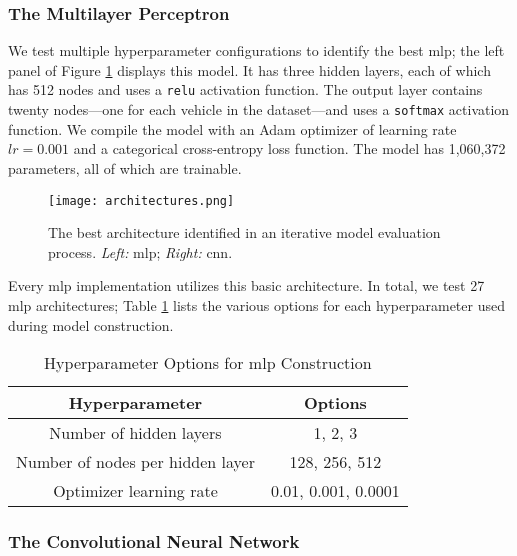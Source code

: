 \documentclass[../main.tex]{subfiles}
\begin{document}
\subsubsection{The Multilayer Perceptron}\label{model:mlp}


We test multiple hyperparameter configurations to identify the best \ac{mlp}; the left panel of Figure \ref{fig:best-archs} displays this model. It has three hidden layers, each of which has 512 nodes and uses a \texttt{relu} activation function. The output layer contains twenty nodes---one for each vehicle in the dataset---and uses a \texttt{softmax} activation function. We compile the model with an Adam optimizer of learning rate $lr = 0.001$ and a categorical cross-entropy loss function. The model has 1,060,372 parameters, all of which are trainable.

\begin{figure}
    \centerline{\texttt{[image: architectures.png]}}
    \caption{The best architecture identified in an iterative model evaluation process. \textit{Left:} \acl{mlp}; \textit{Right:} \acl{cnn}.}
    \label{fig:best-archs}
\end{figure}

Every \ac{mlp} implementation utilizes this basic architecture. In total, we test 27 \ac{mlp} architectures; Table \ref{tab:mlp-archs} lists the various options for each hyperparameter used during model construction.

\begin{table}
    \caption{Hyperparameter Options for \ac{mlp} Construction}
    \centering
    \label{tab:mlp-archs}
    \begin{tabular}{|c|c|}
    \hline
    \textbf{Hyperparameter} & \textbf{Options} \\
    \hline
    Number of hidden layers          & 1, 2, 3             \\
    Number of nodes per hidden layer & 128, 256, 512       \\
    Optimizer learning rate          & 0.01, 0.001, 0.0001 \\
    \hline
    \end{tabular}
\end{table}

\subsubsection{The Convolutional Neural Network}\label{model:cnn}
\end{document}
